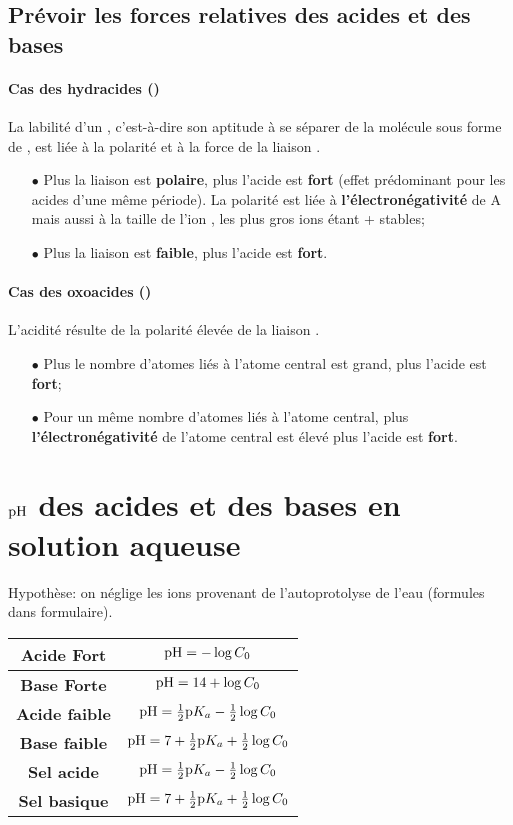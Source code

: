 \subsection{Prévoir les forces relatives des acides et des bases}

\paragraph{Cas des hydracides ()}
La labilité d'un , c'est-à-dire son aptitude à se séparer de la molécule  sous forme de ,
est liée à la polarité et à la force de la liaison .
\begin{itemize}
\item[$\bullet$] Plus la liaison est \textbf{polaire}, plus l'acide est \textbf{fort} (effet prédominant pour les acides d'une même période).
	La polarité est liée à \textbf{l'électronégativité} de A mais aussi à la taille de l'ion , les plus gros ions étant + stables;
\item[$\bullet$]Plus la liaison est \textbf{faible}, plus l'acide est \textbf{fort}.
\end{itemize}

\paragraph{Cas des oxoacides ()}
L'acidité résulte de la polarité élevée de la liaison .
\begin{itemize}
		\item[$\bullet$] Plus le nombre d'atomes \textbf{} liés à l'atome central est grand, plus l'acide est \textbf{fort};
		\item[$\bullet$] Pour un même nombre d'atomes  liés à l'atome central,
		plus \textbf{l'électronégativité} de l'atome central est élevé plus l'acide est \textbf{fort}.
\end{itemize}

\section{$\mathrm{pH}$ des acides et des bases en solution aqueuse}

Hypothèse: on néglige les ions  provenant de l'autoprotolyse de l'eau (formules dans formulaire).

\begin{center}
	\renewcommand{\arraystretch}{1.5}
	\begin{tabular}{|>{\bf}c|c|}
		\hline
		Acide Fort & $\mathrm{pH}=-\log{C_0}$ \\
		\hline
		Base Forte & $\mathrm{pH}=14+\log{C_0}$ \\
		\hline
		Acide faible & $\mathrm{pH}=\frac{1}{2}\mathrm{p}K_a-\frac{1}{2}\log{C_0}$ \\
		\hline
		Base faible & $\mathrm{pH}=7+\frac{1}{2}\mathrm{p}K_a+\frac{1}{2}\log{C_0}$ \\
		\hline
		Sel acide & $\mathrm{pH}=\frac{1}{2}\mathrm{p}K_a-\frac{1}{2}\log{C_0}$ \\
		\hline
		Sel basique & $\mathrm{pH}=7+\frac{1}{2}\mathrm{p}K_a+\frac{1}{2}\log{C_0}$ \\
		\hline
	\end{tabular}
\end{center}

